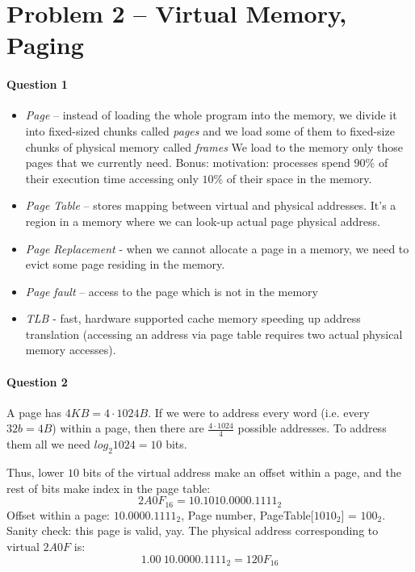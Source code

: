 \section{Problem 2 – Virtual Memory, Paging}

\paragraph{Question 1}
\begin{itemize}
    \item \emph{Page} – instead of loading the whole program into the memory, we divide it into fixed-sized chunks called \emph{pages}
    and we load some of them to fixed-size chunks of physical memory called \emph{frames}
    We load to the memory only those pages that we currently need. 
    Bonus: motivation: processes spend $90\%$ of their execution time accessing only $10\%$ of their space in the memory.
    \item \emph{Page Table} – stores mapping between virtual and physical addresses. It's a region in a memory where we can look-up actual page physical address.
    \item \emph{Page Replacement} - when we cannot allocate a page in a memory, we need to evict some page residing in the memory.
    \item \emph{Page fault} – access to the page which is not in the memory
    \item \emph{TLB} - fast, hardware supported cache memory speeding up address translation (accessing an address via page table requires two actual physical memory accesses).
\end{itemize}


\paragraph{Question 2}

A page has $4KB = 4 \cdot 1024B$.
If we were to address every word (i.e. every $32b = 4B$) within a page, 
then there are $\frac{4\cdot 1024}{4}$ possible addresses.
To address them all we need $log_2 1024 = 10$ bits.

Thus, lower $10$ bits of the virtual address make an offset within a page, and the rest of bits make index in the page table:
\begin{equation*}
    2A0F_{16} = 10.1010.0000.1111_2    
\end{equation*}
Offset within a page: $10.0000.1111_2$,
Page number, PageTable[$1010_2$] = $100_2$.
Sanity check: this page is valid, yay.
The physical address corresponding to virtual $2A0F$ is:
\begin{equation*}
    1.00\: 10.0000.1111_2 = 120F_{16}
\end{equation*}

